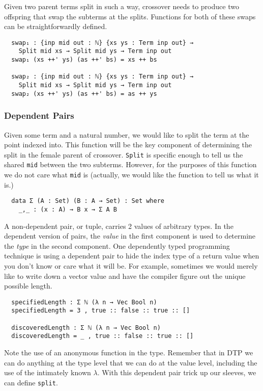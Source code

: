 \documentclass[runningheads,a4paper]{llncs}
\begin{document}
Given two parent terms split in such a way, crossover needs to produce
two offspring that swap the subterms at the splits. Functions for both
of these swaps can be straightforwardly defined.

\begin{verbatim}
  swap₁ : {inp mid out : ℕ} {xs ys : Term inp out} →
    Split mid xs → Split mid ys → Term inp out
  swap₁ (xs ++' ys) (as ++' bs) = xs ++ bs

  swap₂ : {inp mid out : ℕ} {xs ys : Term inp out} →
    Split mid xs → Split mid ys → Term inp out
  swap₂ (xs ++' ys) (as ++' bs) = as ++ ys
\end{verbatim}

\subsubsection{Dependent Pairs}

Given some term and a natural number, we would like to split the term
at the point indexed into. This function will be the key component of
determining the split in the female parent of
crossover. \texttt{Split} is specific enough to tell us the shared
\texttt{mid} between the two subterms. However, for the purposes of this
function we do not care what \texttt{mid} is (actually, we would like
the function to tell us what it is.)

\begin{verbatim}
  data Σ (A : Set) (B : A → Set) : Set where
    _,_ : (x : A) → B x → Σ A B
\end{verbatim}

A non-dependent pair, or tuple, carries 2 values of arbitrary
types. In the dependent version of pairs, the \textit{value} in the first
component is used to determine the \textit{type} in the second
component. One dependently typed programming technique is using a
dependent pair to hide the index type of a return value when you don't
know or care what it will be. For example, sometimes we would merely
like to write down a vector value and have the compiler figure out the
unique possible length.

\begin{verbatim}
  specifiedLength : Σ ℕ (λ n → Vec Bool n)
  specifiedLength = 3 , true :: false :: true :: []

  discoveredLength : Σ ℕ (λ n → Vec Bool n)
  discoveredLength = _ , true :: false :: true :: []
\end{verbatim}

Note the use of an anonymous function in the type. Remember that in DTP
we can do anything at the type level that we can do at the value
level, including the use of the intimately known $\lambda$. With this
dependent pair trick up our sleeves, we can define \texttt{split}.
\end{document}
